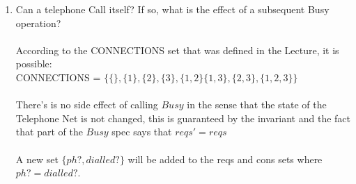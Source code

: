 \documentclass{article}
\begin{document}
\begin{enumerate}
\begin{enumerate}
\item Can a telephone Call itself? If so, what is the effect of a
  subsequent Busy operation? \\
  \\
  \color{blue}
  According to the CONNECTIONS set that was defined in the Lecture, it is possible: \\
  CONNECTIONS = $\{ \{\}, \{1\}, \{2\}, \{3\}, \{1,2\} \{1,3\}, \{2,3\}, \{1,2,3\} \}$ \\
  \\
  There's is no side effect of calling $Busy$ in the sense that the state of the Telephone Net is not changed, this is guaranteed by the invariant and the fact that part of the $Busy$ spec says that $reqs' = reqs$ \\
  \\
  A new set $\{ph?, dialled?\}$ will be added to the reqs and cons sets where $ph? = dialled?$. \\
  \color{black}


\end{enumerate}
\end{enumerate}
\end{document}
